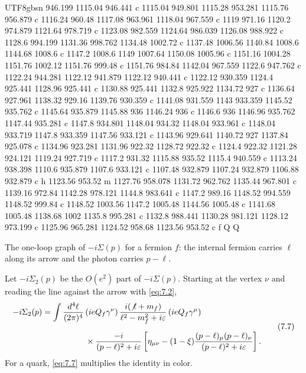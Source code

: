 \documentclass[11pt,a4paper,oneside]{report}
\begin{document}
\begin{CJK*}{UTF8}{gbsn}
{946.199 1115.04 946.441 c 1115.04 949.801 1115.28 953.281 1115.76 956.879 c 1116.24 960.48 1117.08
963.961 1118.04 967.559 c 1119 971.16 1120.2 974.879 1121.64 978.719 c 1123.08 982.559 1124.64 986.039
1126.08 988.922 c 1128.6 994.199 1131.36 998.762 1134.48 1002.72 c 1137.48 1006.56 1140.84 1008.6 1144.68
1008.6 c 1147.2 1008.6 1149 1007.64 1150.08 1005.96 c 1151.16 1004.28 1151.76 1002.12 1151.76 999.48 c
1151.76 984.84 1142.04 967.559 1122.6 947.762 c 1122.24 944.281 1122.12 941.879 1122.12 940.441 c 1122.12
930.359 1124.4 925.441 1128.96 925.441 c 1130.88 925.441 1132.8 925.922 1134.72 927 c 1136.64 927.961
1138.32 929.16 1139.76 930.359 c 1141.08 931.559 1143 933.359 1145.52 935.762 c 1145.64 935.879 1145.88
936 1146.24 936 c 1146.6 936 1146.96 935.762 1147.44 935.281 c 1147.8 934.801 1148.04 934.32 1148.04
933.961 c 1148.04 933.719 1147.8 933.359 1147.56 933.121 c 1143.96 929.641 1140.72 927 1137.84 925.078 c
1134.96 923.281 1131.96 922.32 1128.72 922.32 c 1124.4 922.32 1121.28 924.121 1119.24 927.719 c 1117.2
931.32 1115.88 935.52 1115.4 940.559 c 1113.24 938.398 1110.6 935.879 1107.6 933.121 c 1107.48 932.879
1107.24 932.879 1106.88 932.879 c h 1123.56 953.52 m 1127.76 958.078 1131.72 962.762 1135.44 967.801 c
1139.16 972.84 1142.28 978.121 1144.8 983.641 c 1147.2 989.16 1148.52 994.559 1148.52 999.84 c 1148.52
1003.56 1147.2 1005.48 1144.56 1005.48 c 1141.68 1005.48 1138.68 1002 1135.8 995.281 c 1132.8 988.441
1130.28 981.121 1128.12 973.199 c 1125.96 965.281 1124.52 958.68 1123.56 953.52 c f Q Q
}

The one-loop graph of $-i\Sigma(p)$ for a fermion $f$: the internal fermion carries $\ell$ along its arrow and the photon carries $p-\ell$.

Let $-i\Sigma_2(p)$ be the $O(e^2)$ part of $-i\Sigma(p)$. Starting at the vertex $\nu$ and reading the line against the arrow with \eqref{eq:7.2},
\begin{equation*}
\begin{aligned}
-i\Sigma_2(p)
=\int\frac{d^4\ell}{(2\pi)^4}\,
&(ieQ_f\gamma^\nu)\,\frac{i(\not\ell+m_f)}{\ell^2-m_f^2+i\varepsilon}\,(ieQ_f\gamma^\mu)\\[6pt]
&\times\frac{-i}{(p-\ell)^2+i\varepsilon}\left[\eta_{\mu\nu}-(1-\xi)\frac{(p-\ell)_\mu(p-\ell)_\nu}{(p-\ell)^2+i\varepsilon}\right].
\end{aligned}
\tag{7.7}\label{eq:7.7}
\end{equation*}
For a quark, \eqref{eq:7.7} multiplies the identity in color.


\end{CJK*}
\end{document}
